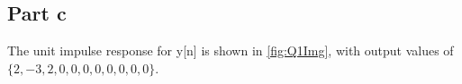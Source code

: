 \subsection{Part c}

The unit impulse response for y[n] is shown in \ref{fig:Q1Img}, with output
values of $\{2,-3,2,0,0,0,0,0,0,0,0\}$.
